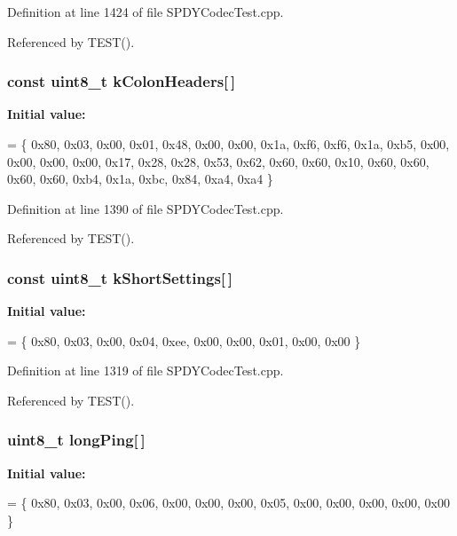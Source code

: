 Definition at line 1424 of file S\+P\+D\+Y\+Codec\+Test.\+cpp.



Referenced by T\+E\+S\+T().

\subsubsection[{k\+Colon\+Headers}]{\setlength{\rightskip}{0pt plus 5cm}const uint8\+\_\+t k\+Colon\+Headers[$\,$]}\label{SPDYCodecTest_8cpp_a3d39f09aa938389ef1e29c5aeda469e0}
{\bfseries Initial value\+:}
\begin{DoxyCode}
= \{
  0x80, 0x03, 0x00, 0x01, 0x48, 0x00, 0x00, 0x1a, 0xf6, 0xf6, 0x1a, 0xb5,
  0x00, 0x00, 0x00, 0x00, 0x17, 0x28, 0x28, 0x53, 0x62, 0x60, 0x60, 0x10,
  0x60, 0x60, 0x60, 0x60, 0xb4, 0x1a, 0xbc, 0x84, 0xa4, 0xa4
\}
\end{DoxyCode}


Definition at line 1390 of file S\+P\+D\+Y\+Codec\+Test.\+cpp.



Referenced by T\+E\+S\+T().

\subsubsection[{k\+Short\+Settings}]{\setlength{\rightskip}{0pt plus 5cm}const uint8\+\_\+t k\+Short\+Settings[$\,$]}\label{SPDYCodecTest_8cpp_a4c83311f67dbbaef65864929f63717ba}
{\bfseries Initial value\+:}
\begin{DoxyCode}
= \{
  0x80, 0x03, 0x00, 0x04, 0xee, 0x00, 0x00, 0x01, 0x00, 0x00
\}
\end{DoxyCode}


Definition at line 1319 of file S\+P\+D\+Y\+Codec\+Test.\+cpp.



Referenced by T\+E\+S\+T().

\subsubsection[{long\+Ping}]{\setlength{\rightskip}{0pt plus 5cm}uint8\+\_\+t long\+Ping[$\,$]}\label{SPDYCodecTest_8cpp_a8a922eaeb35b406e465651d87e136975}
{\bfseries Initial value\+:}
\begin{DoxyCode}
=
\{ 0x80, 0x03, 0x00, 0x06,
  0x00, 0x00, 0x00, 0x05,
  0x00, 0x00, 0x00, 0x00,
  0x00
\}
\end{DoxyCode}


